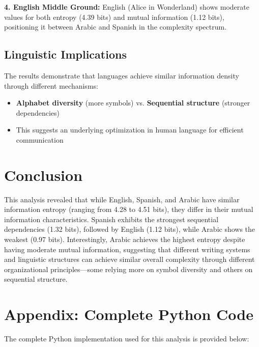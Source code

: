 \documentclass[12pt]{article}
\begin{document}
\textbf{4. English Middle Ground:} English (Alice in Wonderland) shows moderate values for both entropy (4.39 bits) and mutual information (1.12 bits), positioning it between Arabic and Spanish in the complexity spectrum.

\subsection{Linguistic Implications}

The results demonstrate that languages achieve similar information density through different mechanisms:
\begin{itemize}
    \item \textbf{Alphabet diversity} (more symbols) vs. \textbf{Sequential structure} (stronger dependencies)
    \item This suggests an underlying optimization in human language for efficient communication
\end{itemize}

\section{Conclusion}

This analysis revealed that while English, Spanish, and Arabic have similar information entropy (ranging from 4.28 to 4.51 bits), they differ in their mutual information characteristics. Spanish exhibits the strongest sequential dependencies (1.32 bits), followed by English (1.12 bits), while Arabic shows the weakest (0.97 bits). Interestingly, Arabic achieves the highest entropy despite having moderate mutual information, suggesting that different writing systems and linguistic structures can achieve similar overall complexity through different organizational principles---some relying more on symbol diversity and others on sequential structure.

\clearpage

\section{Appendix: Complete Python Code}

The complete Python implementation used for this analysis is provided below:
\end{document}

